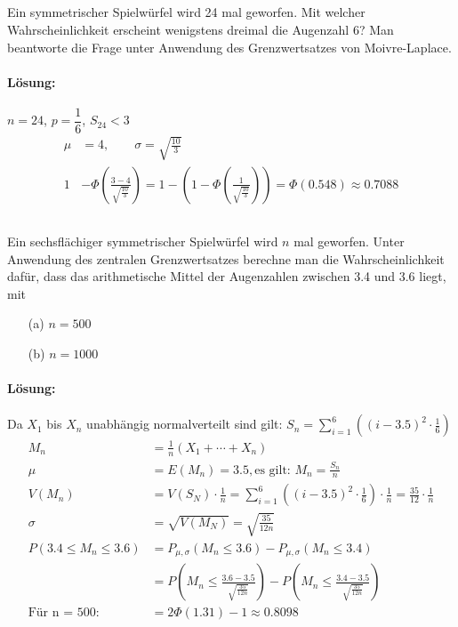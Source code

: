 \documentclass[ngerman]{scrartcl}
\begin{document}
\subsection{}
Ein symmetrischer Spielwürfel wird 24 mal geworfen. Mit welcher Wahrscheinlichkeit erscheint wenigstens dreimal die Augenzahl 6? Man beantworte die Frage unter Anwendung des Grenzwertsatzes von Moivre-Laplace.
\paragraph{Lösung:}
$n = 24$, $p = \dfrac{1}{6}$, $S_{24} < 3$
\begin{align*}
\mu &= 4,\qquad \sigma = \sqrt{\frac{10}{3}}\\
1 &- \Phi\left(\frac{3 - 4}{\sqrt{\frac{10}{3}}}\right) = 1 - \left(1 - \Phi\left( \frac{1}{\sqrt{\frac{10}{3}}}  \right)\right) = \Phi(0.548) \approx 0.7088
\end{align*}
\subsection{}
Ein sechsflächiger symmetrischer Spielwürfel wird $n$ mal geworfen. Unter Anwendung des zentralen Grenzwertsatzes berechne man die Wahrscheinlichkeit dafür, dass das arithmetische Mittel der Augenzahlen zwischen 3.4 und 3.6 liegt, mit 
\begin{enumerate}
\item[(a)] $n =500$
\item[(b)] $n =1000$
\end{enumerate}
\paragraph{Lösung:}
Da $X_1$ bis $X_n$ unabhängig normalverteilt sind gilt: $S_n = \sum_{i=1}^{6}\left( (i - 3.5)^{2}\cdot \frac{1}{6}\right)$
\begin{align*}
M_n &= \frac{1}{n}(X_1 + \cdots + X_n)\\
\mu &= E(M_n) = 3.5, \text{es gilt: } M_n = \frac{S_n}{n}\\
V(M_n) &= V(S_N)\cdot \frac{1}{n} = \sum_{i=1}^{6}\left( (i - 3.5)^{2}\cdot \frac{1}{6}\right) \cdot\frac{1}{n}= \frac{35}{12}\cdot \frac{1}{n}\\
\sigma &= \sqrt{V(M_N)} = \sqrt{\frac{35}{12n}}\\
P(3.4 \le M_n \le 3.6) &= P_{\mu, \sigma}(M_n\le 3.6) - P_{\mu, \sigma}(M_n \le 3.4) \\
&= P\left(M_n \le \frac{3.6 - 3.5}{\sqrt{\frac{35}{12n}}}\right) - P\left(M_n \le \frac{3.4 - 3.5}{\sqrt{\frac{35}{12n}}}\right) \\
\text{Für n = 500: }&= 2 \Phi \left(1.31\right) - 1 \approx 0.8098
\end{align*}
\end{document}
